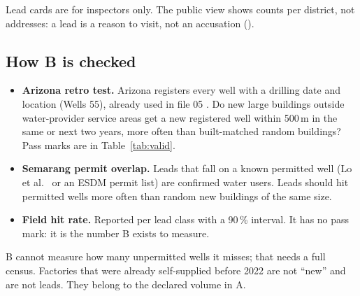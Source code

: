 Lead cards are for inspectors only. The public view shows counts per district, not addresses: a lead is a
reason to visit, not an accusation ().

\subsection{How B is checked}

\begin{itemize}
\item {} \textbf{Arizona retro test.} Arizona registers every well with a drilling date and location
  (Wells 55), already used in file 05 \cite{exp05}. Do new large buildings outside water-provider service
  areas get a new registered well within 500\,m in the same or next two years, more often than
  built-matched random buildings? Pass marks are in Table~\ref{tab:valid}.
\item {} \textbf{Semarang permit overlap.} Leads that fall on a known permitted well (Lo et al.\
  \cite{lo2022} or an ESDM permit list) are confirmed water users. Leads should hit permitted wells more
  often than random new buildings of the same size.
\item {} \textbf{Field hit rate.} Reported per lead class with a 90\,\% interval. It has no pass mark:
  it is the number B exists to measure.
\end{itemize}

\begin{caution}
B cannot measure how many unpermitted wells it misses; that needs a full census. Factories that were already
self-supplied before 2022 are not ``new'' and are not leads. They belong to the declared volume in A.
\end{caution}
